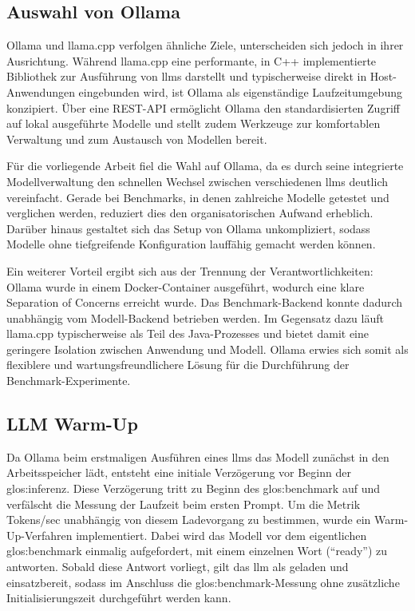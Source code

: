 \subsection{Auswahl von Ollama}\label{subsec:auswahl-von-ollama}

Ollama und llama.cpp verfolgen ähnliche Ziele, unterscheiden sich jedoch in ihrer Ausrichtung.
Während llama.cpp eine performante, in C++ implementierte Bibliothek zur Ausführung von \glspl{llm} darstellt und typischerweise direkt in Host-Anwendungen eingebunden wird, ist Ollama als eigenständige Laufzeitumgebung konzipiert.
Über eine REST-API ermöglicht Ollama den standardisierten Zugriff auf lokal ausgeführte Modelle und stellt zudem Werkzeuge zur komfortablen Verwaltung und zum Austausch von Modellen bereit.

Für die vorliegende Arbeit fiel die Wahl auf Ollama, da es durch seine integrierte Modellverwaltung den schnellen Wechsel zwischen verschiedenen \glspl{llm} deutlich vereinfacht.
Gerade bei Benchmarks, in denen zahlreiche Modelle getestet und verglichen werden, reduziert dies den organisatorischen Aufwand erheblich.
Darüber hinaus gestaltet sich das Setup von Ollama unkompliziert, sodass Modelle ohne tiefgreifende Konfiguration lauffähig gemacht werden können.

Ein weiterer Vorteil ergibt sich aus der Trennung der Verantwortlichkeiten: Ollama wurde in einem Docker-Container ausgeführt, wodurch eine klare Separation of Concerns erreicht wurde.
Das Benchmark-Backend konnte dadurch unabhängig vom Modell-Backend betrieben werden.
Im Gegensatz dazu läuft llama.cpp typischerweise als Teil des Java-Prozesses und bietet damit eine geringere Isolation zwischen Anwendung und Modell.
Ollama erwies sich somit als flexiblere und wartungsfreundlichere Lösung für die Durchführung der Benchmark-Experimente.


\subsection{LLM Warm-Up}\label{subsec:llm-warm-up}

Da Ollama beim erstmaligen Ausführen eines \glspl{llm} das Modell zunächst in den Arbeitsspeicher lädt, entsteht eine initiale Verzögerung vor Beginn der \gls{glos:inferenz}.
Diese Verzögerung tritt zu Beginn des \gls{glos:benchmark} auf und verfälscht die Messung der Laufzeit beim ersten Prompt.
Um die Metrik Tokens/sec unabhängig von diesem Ladevorgang zu bestimmen, wurde ein Warm-Up-Verfahren implementiert.
Dabei wird das Modell vor dem eigentlichen \gls{glos:benchmark} einmalig aufgefordert, mit einem einzelnen Wort (\enquote{ready}) zu antworten.
Sobald diese Antwort vorliegt, gilt das \gls{llm} als geladen und einsatzbereit, sodass im Anschluss die \gls{glos:benchmark}-Messung ohne zusätzliche Initialisierungszeit durchgeführt werden kann.

